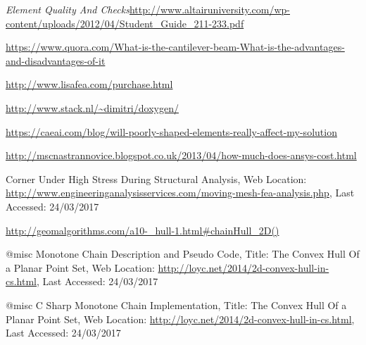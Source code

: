 \begin{changemargin}{\CMwidth}{\CMheight}
\begin{thebibliography}{9}
\emph{Element Quality And Checks}\url{http://www.altairuniversity.com/wp-content/uploads/2012/04/Student_Guide_211-233.pdf}

 \url{https://www.quora.com/What-is-the-cantilever-beam-What-is-the-advantages-and-disadvantages-of-it}

 \url{http://www.lisafea.com/purchase.html}

 \url{http://www.stack.nl/~dimitri/doxygen/} 

 \url{https://caeai.com/blog/will-poorly-shaped-elements-really-affect-my-solution}

  

 \url{http://mscnastrannovice.blogspot.co.uk/2013/04/how-much-does-ansys-cost.html}


 {Corner Under High Stress During Structural Analysis,
  {Web Location: \url{http://www.engineeringanalysisservices.com/moving-mesh-fea-analysis.php}},
 {Last Accessed: 24/03/2017}}
 
 
 \url{http://geomalgorithms.com/a10-_hull-1.html#chainHull_2D()}


 @misc{ Monotone Chain Description and Pseudo Code,
  {Title: The Convex Hull Of a Planar Point Set},
  {Web Location: \url{http://loyc.net/2014/2d-convex-hull-in-cs.html}},
  {Last Accessed: 24/03/2017}}
  
  


 @misc{ C Sharp Monotone Chain Implementation,
  {Title: The Convex Hull Of a Planar Point Set},
  {Web Location: \url{http://loyc.net/2014/2d-convex-hull-in-cs.html}},
  {Last Accessed: 24/03/2017}}
  



\end{thebibliography}
\end{changemargin}
